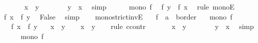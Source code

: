 \begin{isabellebody}
\ \ \ \ \isamarkupfalse%
\ {\isachardoublequoteopen}{\isasymnot}\ x\ {\isasymle}\ y{\isachardoublequoteclose}\isanewline
\ \ \ \ \isamarkupfalse%
\ \isamarkupfalse%
\ {\isachardoublequoteopen}y\ {\isasymle}\ x{\isachardoublequoteclose}\ \isamarkupfalse%
\ simp\isanewline
\ \ \ \ \isamarkupfalse%
\ {\isacartoucheopen}mono\ f{\isacartoucheclose}\ \isamarkupfalse%
\ {\isachardoublequoteopen}f\ y\ {\isasymle}\ f\ x{\isachardoublequoteclose}\ \isamarkupfalse%
\ {\isacharparenleft}{\kern0pt}rule\ monoE{\isacharparenright}{\kern0pt}\isanewline
\ \ \ \ \isamarkupfalse%
\ {\isacartoucheopen}f\ x\ {\isacharless}{\kern0pt}\ f\ y{\isacartoucheclose}\ \isamarkupfalse%
\ False\ \isamarkupfalse%
\ simp\isanewline
\ \ \isamarkupfalse%
\isanewline
{}\isamarkupfalse%
%
\endisatagproof
{\isafoldproof}%
%
\isadelimproof
\isanewline
%
\endisadelimproof
\isanewline
{}\isamarkupfalse%
\ mono{\isacharunderscore}{\kern0pt}strict{\isacharunderscore}{\kern0pt}invE{\isacharcolon}{\kern0pt}\isanewline
\ \ \ f\ {\isacharcolon}{\kern0pt}{\isacharcolon}{\kern0pt}\ {\isachardoublequoteopen}{\isacharprime}{\kern0pt}a\ {\isasymRightarrow}\ {\isacharprime}{\kern0pt}b{\isacharcolon}{\kern0pt}{\isacharcolon}{\kern0pt}order{\isachardoublequoteclose}\isanewline
\ \ \ {\isachardoublequoteopen}mono\ f{\isachardoublequoteclose}\isanewline
\ \ \ {\isachardoublequoteopen}f\ x\ {\isacharless}{\kern0pt}\ f\ y{\isachardoublequoteclose}\isanewline
\ \ \ {\isachardoublequoteopen}x\ {\isacharless}{\kern0pt}\ y{\isachardoublequoteclose}\isanewline
%
\isadelimproof
%
\endisadelimproof
%
\isatagproof
{}\isamarkupfalse%
\isanewline
\ \ \isamarkupfalse%
\ {\isachardoublequoteopen}x\ {\isacharless}{\kern0pt}\ y{\isachardoublequoteclose}\isanewline
\ \ \isamarkupfalse%
\ {\isacharparenleft}{\kern0pt}rule\ ccontr{\isacharparenright}{\kern0pt}\isanewline
\ \ \ \ \isamarkupfalse%
\ {\isachardoublequoteopen}{\isasymnot}\ x\ {\isacharless}{\kern0pt}\ y{\isachardoublequoteclose}\isanewline
\ \ \ \ \isamarkupfalse%
\ \isamarkupfalse%
\ {\isachardoublequoteopen}y\ {\isasymle}\ x{\isachardoublequoteclose}\ \isamarkupfalse%
\ simp\isanewline
\ \ \ \ \isamarkupfalse%
\ {\isacartoucheopen}mono\ f{\isacartoucheclose}\ \isamarkupfalse%

\end{isabellebody}
